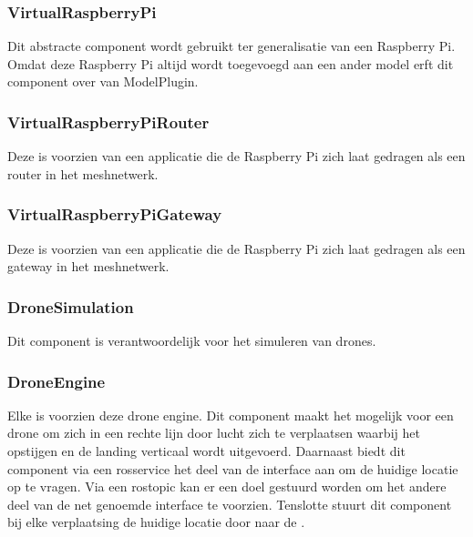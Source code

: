 \documentclass[a4paper, 11pt, oneside]{report}
\begin{document}
\subsubsection{VirtualRaspberryPi}
\label{architectural:subcomponenten:VirtualRaspberryPi}
Dit abstracte component wordt gebruikt ter generalisatie van een Raspberry Pi.
Omdat deze Raspberry Pi altijd wordt toegevoegd aan een ander model erft dit component over van ModelPlugin.    

\subsubsection{VirtualRaspberryPiRouter}
\label{architectural:subcomponenten:VirtualRaspberryPiRouter}
Deze  is voorzien van een applicatie die de Raspberry Pi zich laat gedragen als een router in het meshnetwerk. 

\subsubsection{VirtualRaspberryPiGateway}
\label{architectural:subcomponenten:VirtualRaspberryPiGateway}
Deze  is voorzien van een applicatie die de Raspberry Pi zich laat gedragen als een gateway in het meshnetwerk. 


\subsubsection{DroneSimulation}
\label{architectural:subcomponenten:DroneSimulation}
Dit component is verantwoordelijk voor het simuleren van drones. 

\subsubsection{DroneEngine}
\label{architectural:subcomponenten:DroneEngine}
Elke  is voorzien deze drone engine. 
Dit component maakt het mogelijk voor een drone om zich in een rechte lijn door lucht zich te verplaatsen waarbij het opstijgen en de landing verticaal wordt uitgevoerd.
Daarnaast biedt dit component via een rosservice het deel van de interface  aan om de huidige locatie op te vragen.
Via een rostopic kan er een doel gestuurd worden om het andere deel van de net genoemde interface te voorzien.
Tenslotte stuurt dit component bij elke verplaatsing de huidige locatie door naar de . 
\end{document}
